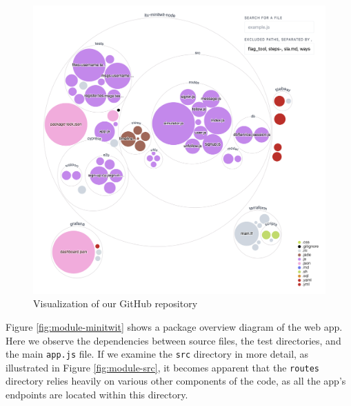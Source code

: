 \begin{figure}[]
    \centering
    \includegraphics[width=\linewidth]{images/repo-visualizer.png}
    \caption{Visualization of our GitHub repository}
    \label{fig:repo-visualized}
\end{figure}

Figure \ref{fig:module-minitwit} shows a package overview diagram of the web app. Here we observe the dependencies between source files, the test directories, and the main \texttt{app.js} file. If we examine the \texttt{src} directory in more detail, as illustrated in Figure \ref{fig:module-src}, it becomes apparent that the \texttt{routes} directory relies heavily on various other components of the code, as all the app's endpoints are located within this directory. \\

